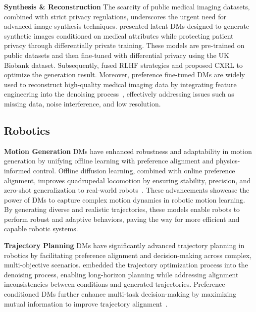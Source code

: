 \noindent\textbf{Synthesis \& Reconstruction} The scarcity of public medical imaging datasets, combined with strict privacy regulations, underscores the urgent need for advanced image synthesis techniques. \citet{daum2024differentially} presented latent DMs designed to generate synthetic images conditioned on  medical attributes while protecting patient privacy through differentially private training. These models are pre-trained on public datasets and then fine-tuned with differential privacy using the UK Biobank dataset. Subsequently, \citet{han2024advancing} fused RLHF strategies and proposed CXRL to optimize the generation result.
Moreover, preference fine-tuned DMs are widely used to reconstruct high-quality medical imaging data by integrating feature engineering into the denoising process~\citep{xie2022measurement}, effectively addressing issues such as missing data, noise interference, and low resolution.

\subsection{Robotics}

\textbf{Motion Generation} DMs have enhanced robustness and adaptability in motion generation by unifying offline learning with preference alignment and physics-informed control. Offline diffusion learning, combined with online preference alignment, improves quadrupedal locomotion by ensuring stability, precision, and zero-shot generalization to real-world robots~\citep{yuan2024preferencealigneddiffusionplanner}. These advancements showcase the power of DMs to capture complex motion dynamics in robotic motion learning. By generating diverse and realistic trajectories, these models enable robots to perform robust and adaptive behaviors, paving the way for more efficient and capable robotic systems.

\noindent\textbf{Trajectory Planning} DMs have significantly advanced trajectory planning in robotics by facilitating preference alignment and decision-making across complex, multi-objective scenarios. \citet{janner2022planningdiffusionflexiblebehavior} embedded the trajectory optimization process into the denoising process, enabling long-horizon planning while addressing alignment inconsistencies between conditions and generated trajectories. Preference-conditioned DMs further enhance multi-task decision-making by maximizing mutual information to improve trajectory alignment~\citep{yu2024regularized}. 

